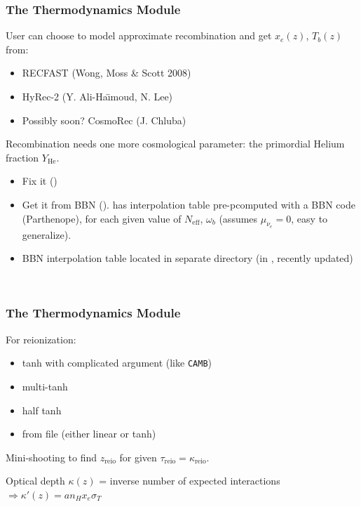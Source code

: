 \begin{frame}[fragile]
\frametitle{The Thermodynamics Module}

User can choose to model approximate recombination and get $x_e(z)$, $T_b(z)$ from:
\begin{itemize}
\item {\Purple RECFAST} (Wong, Moss \& Scott 2008)
\item {\Purple HyRec-2} (Y. Ali-Ha\"{\i}moud, N. Lee)
\item Possibly soon? {\Purple CosmoRec} (J. Chluba)
\end{itemize}

\pause
\vspace{0.2cm}

Recombination needs one more cosmological parameter: the {\Red primordial Helium fraction} $Y_\mathrm{He}$.
\begin{itemize}
\item Fix it ()
\item Get it from BBN (). {\Red \CLASS{}} has interpolation table pre-pcomputed with a {\Red BBN code} ({\Purple Parthenope}), for each given value of $N_\mathrm{eff}$, $\omega_b$ (assumes $\mu_{\nu_e}=0$, easy to generalize).
\item BBN interpolation table located in separate directory (in , recently updated)
\end{itemize}


\mbox{}\\

\end{frame}


\begin{frame}[fragile]
	\frametitle{The Thermodynamics Module}
	
	For reionization:
	\begin{itemize}
		\item tanh with complicated argument (like {\tt \Red CAMB})
		\item multi-tanh
		\item half tanh
		\item from file (either linear or tanh)
	\end{itemize}
	
	\pause 
	\vspace{0.2cm}
	Mini-shooting to find $z_\mathrm{reio}$ for given $\tau_\mathrm{reio} = \kappa_\mathrm{reio}$. 
	
	Optical depth $\kappa(z)$ = inverse number of expected interactions  $\Rightarrow \kappa'(z) = a n_H x_e \sigma_T$\\
\end{frame}


